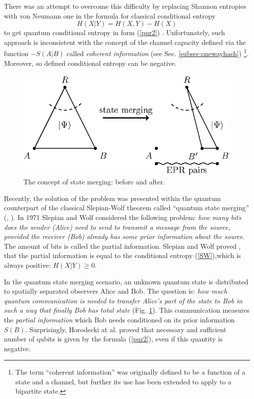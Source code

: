 \documentclass[twocolumn,aps,rmp]{revtex4}
\begin{document}
There was an attempt \cite {cerfadami} to overcome this difficulty by
replacing Shannon entropies with von Neumann one in the formula for
classical conditional entropy
\begin{equation}
H(X|Y)=H(X,Y)-H(X) \label{SW}
\end{equation}
to get quantum conditional entropy in form (\ref {pur2}) \cite
{Wehrl}. Unfortunately, such approach is inconsistent with the concept
of the channel capacity defined via the function $-S(A|B)$ called {\it
  coherent information} (see Sec. \ref{subsec:onewayhash})
\cite{SchumacherN-1996-pra}\footnote{The term ``coherent information''
  was originally defined to be a function of a state and a channel,
  but further its use has been extended to apply to a bipartite
  state.}. Moreover, so defined conditional entropy can be
negative.


\begin{figure}
  \centering
%  
  \includegraphics{fig-merging}
  \caption{The concept of state merging: before and after.}
  \label{fig:merging}
\end{figure}

Recently, the solution of the problem was presented within the quantum
counterpart of the classical Slepian-Wolf theorem called ``quantum
state merging'' (\cite {SW-nature}, \cite {sw-long}). In 1971 Slepian
and Wolf considered the following problem: {\it how many bits does the
  sender (Alice) need to send to transmit a message from the source,
  provided the receiver (Bob) already has some prior information about
  the source}. The amount of bits is called the partial
information. Slepian and Wolf proved \cite {Slepian}, that the partial
information is equal to the conditional entropy (\ref {SW}),which is
always positive: $H(X|Y)\geq0$.

In the quantum state merging scenario, an unknown quantum state is
distributed to spatially separated observers Alice and Bob.  The
question is: {\it how much quantum communication is needed to transfer
  Alice's part of the state to Bob in such a way that finally Bob has
  total state} (Fig. \ref{fig:merging}). This communication measures
the { \it partial information} which Bob needs conditioned on its
prior information $S(B)$. Surprisingly, Horodecki at al. proved that
necessary and sufficient number of qubits is given by the formula
(\ref {pur2}), even if this quantity is negative.
\end{document}
